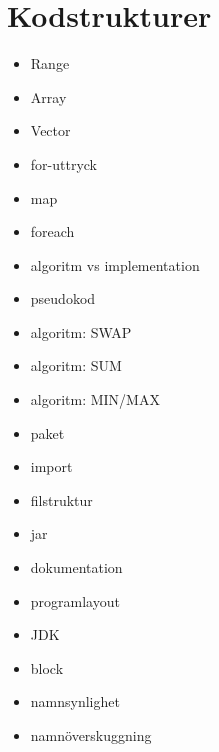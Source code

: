 \chapter{Kodstrukturer}\label{chapter:W02}
\begin{itemize}[nosep]
\item Range
\item Array
\item Vector
\item for-uttryck
\item map
\item foreach
\item algoritm vs implementation
\item pseudokod
\item algoritm: SWAP
\item algoritm: SUM
\item algoritm: MIN/MAX
\item paket
\item import
\item filstruktur
\item jar
\item dokumentation
\item programlayout
\item JDK
\item block
\item namnsynlighet
\item namnöverskuggning
\end{itemize}